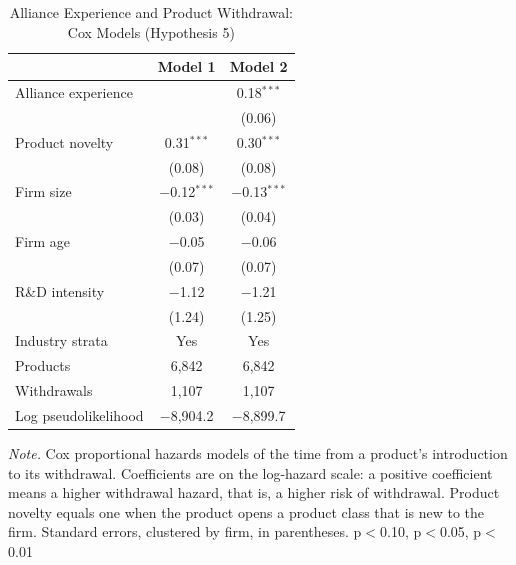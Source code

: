 \documentclass[12pt]{article}
\begin{document}
\begin{table}[p]
\centering\small
\caption{Alliance Experience and Product Withdrawal: Cox Models (Hypothesis 5)}
\begin{tabular}{lcc}
\toprule
 & Model 1 & Model 2 \\
\midrule
Alliance experience &  & 0.18$^{***}$ \\
 &  & (0.06) \\[2pt]
Product novelty & 0.31$^{***}$ & 0.30$^{***}$ \\
 & (0.08) & (0.08) \\[2pt]
Firm size & $-$0.12$^{***}$ & $-$0.13$^{***}$ \\
 & (0.03) & (0.04) \\[2pt]
Firm age & $-$0.05 & $-$0.06 \\
 & (0.07) & (0.07) \\[2pt]
R\&D intensity & $-$1.12 & $-$1.21 \\
 & (1.24) & (1.25) \\[2pt]
\midrule
Industry strata & Yes & Yes \\
Products & 6,842 & 6,842 \\
Withdrawals & 1,107 & 1,107 \\
Log pseudolikelihood & $-$8,904.2 & $-$8,899.7 \\
\bottomrule
\end{tabular}
\begin{minipage}{0.92\textwidth}\footnotesize\smallskip
\textit{Note.} Cox proportional hazards models of the time from a product's introduction to its withdrawal. Coefficients are on the log-hazard scale: a positive coefficient means a higher withdrawal hazard, that is, a higher risk of withdrawal. Product novelty equals one when the product opens a product class that is new to the firm. Standard errors, clustered by firm, in parentheses. \textasteriskcentered{} p$<$0.10, \textasteriskcentered{}\textasteriskcentered{} p$<$0.05, \textasteriskcentered{}\textasteriskcentered{}\textasteriskcentered{} p$<$0.01
\end{minipage}
\end{table}
\clearpage
\end{document}
